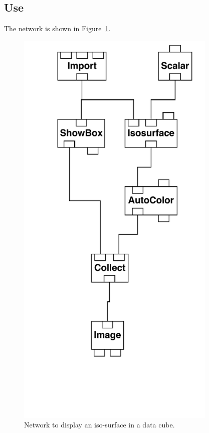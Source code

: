 \documentclass[twoside,11pt]{article}
\begin{document}
\subsection{Use}

The network is shown in Figure~\ref{ISOSURFNETF}.

\begin{figure}[htbp]

\begin{center}
\leavevmode
\includegraphics[width=271pt]{sc2_isosurface}
\end{center}

\caption[Network to display an iso-surface in a data cube.]{Network to
display an iso-surface in a data cube. \label{ISOSURFNETF} }

\end{figure}
\end{document}
